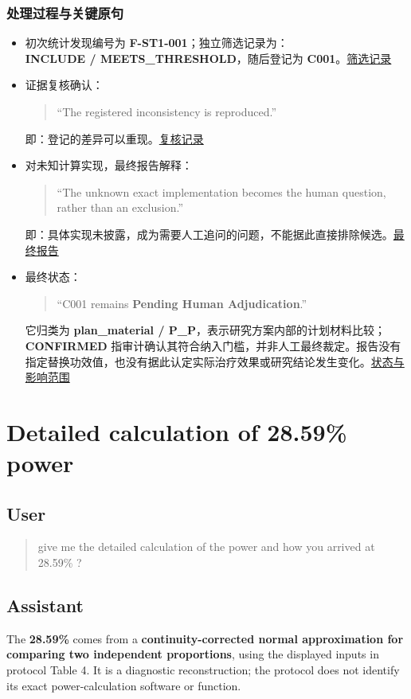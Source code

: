 \documentclass[UTF8,fontset=none,11pt,a4paper]{ctexart}
\newcommand{\recordlink}[2]{\href{#1}{#2}}
\begin{document}
\subsubsection*{处理过程与关键原句}
\begin{itemize}
\item 初次统计发现编号为 \textbf{F-ST1-001}；独立筛选记录为：\\
\textbf{INCLUDE / MEETS\_THRESHOLD}，随后登记为 \textbf{C001}。\recordlink{../.ai_paper_validation/review_1_6_2/screening/inclusion_screen.md}{筛选记录}
\item 证据复核确认：
\begin{quote}
``The registered inconsistency is reproduced.''
\end{quote}
即：登记的差异可以重现。\recordlink{../.ai_paper_validation/review_1_6_2/verification/evidence_recheck.md}{复核记录}
\item 对未知计算实现，最终报告解释：
\begin{quote}
``The unknown exact implementation becomes the human question, rather than an exclusion.''
\end{quote}
即：具体实现未披露，成为需要人工追问的问题，不能据此直接排除候选。\recordlink{../.ai_paper_validation/final_report_1_6_2.md}{最终报告}
\item 最终状态：
\begin{quote}
``C001 remains \textbf{Pending Human Adjudication}.''
\end{quote}
它归类为 \textbf{plan\_material / P\_P}，表示研究方案内部的计划材料比较；\textbf{CONFIRMED} 指审计确认其符合纳入门槛，并非人工最终裁定。报告没有指定替换功效值，也没有据此认定实际治疗效果或研究结论发生变化。\recordlink{../.ai_paper_validation/final_report_1_6_2.md}{状态与影响范围}
\end{itemize}

\clearpage
\section{Detailed calculation of 28.59\% power}
\subsection*{User}
\begin{quote}
give me the detailed calculation of the power and how you arrived at 28.59\% ?
\end{quote}

\subsection*{Assistant}
The \textbf{28.59\%} comes from a \textbf{continuity-corrected normal approximation for comparing two independent proportions}, using the displayed inputs in protocol Table 4. It is a diagnostic reconstruction; the protocol does not identify its exact power-calculation software or function.
\end{document}
